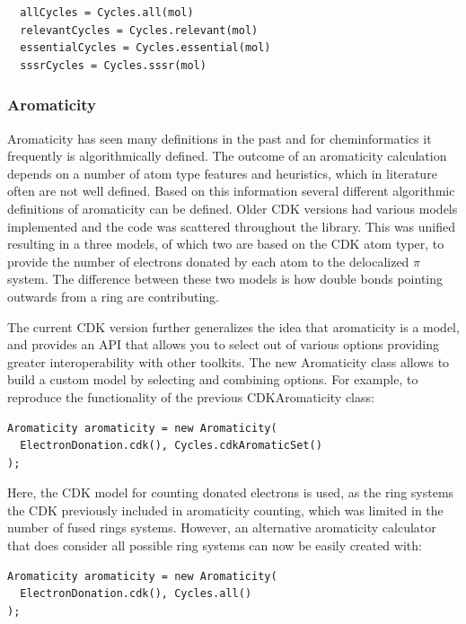 \documentclass[10pt]{bmcart}
\begin{document}
\begin{verbatim}
  allCycles = Cycles.all(mol)
  relevantCycles = Cycles.relevant(mol)
  essentialCycles = Cycles.essential(mol)
  sssrCycles = Cycles.sssr(mol)
\end{verbatim}

  \subsubsection*{Aromaticity}

  Aromaticity has seen many definitions in the past and for cheminformatics it
  frequently is algorithmically defined. The outcome of an aromaticity calculation
  depends on a number of atom type features and heuristics, which in literature
  often are not well defined. Based on this information several different
  algorithmic definitions of aromaticity can be defined. Older CDK versions had
  various models implemented and the code was scattered throughout the library.
  This was unified resulting in a three models, of which two are based on the
  CDK atom typer, to provide the number of electrons donated by each atom to
  the delocalized $\pi$ system. The difference between these two models is
  how double bonds pointing outwards from a ring are contributing.

  The current CDK version further generalizes the idea that aromaticity is a
  model, and provides an API that allows you to select out of various options
  providing greater interoperability with other toolkits. The new
  Aromaticity class allows to build a custom model by selecting and combining
  options. For example, to reproduce the functionality of the previous
  CDKAromaticity class:

\begin{verbatim}
Aromaticity aromaticity = new Aromaticity(
  ElectronDonation.cdk(), Cycles.cdkAromaticSet()
);
\end{verbatim}

Here, the CDK model for counting donated electrons is used, as the ring systems
the CDK previously included in aromaticity counting, which was limited in the 
number of fused rings systems. However, an alternative aromaticity calculator
that does consider all possible ring systems can now be easily created with:

\begin{verbatim}
Aromaticity aromaticity = new Aromaticity(
  ElectronDonation.cdk(), Cycles.all()
);
\end{verbatim}
\end{document}
